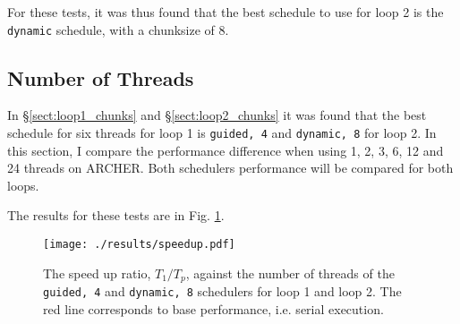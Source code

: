 \documentclass[11pt, a4paper]{article}
\begin{document}
				For these tests, it was thus found that the best schedule to use for loop 2 is the \texttt{dynamic} schedule, with a chunksize of 8.
											
		\subsection{Number of Threads}
			In \S\ref{sect:loop1_chunks} and \S\ref{sect:loop2_chunks} it was found that the best schedule for six threads for loop 1 is \texttt{guided, 4} and \texttt{dynamic, 8} for loop 2. In this section, I compare the performance difference when using 1, 2, 3, 6, 12 and 24 threads on ARCHER. Both schedulers performance will be compared for both loops.
			
			The results for these tests are in Fig. \ref{fig:n_threads}.\
			
			\begin{figure}
				\centering
				\texttt{[image: ./results/speedup.pdf]}
				\caption{The speed up ratio, $T_{1}/T_{p}$, against the number of threads of the \texttt{guided, 4} and \texttt{dynamic, 8} schedulers for loop 1 and loop 2. The red line corresponds to base performance, i.e. serial execution.}
				\label{fig:n_threads}
			\end{figure}
			
\end{document}
